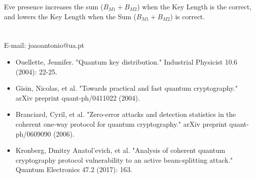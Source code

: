 \documentclass[1000pt]{article}
\newcommand{\mysection}[1]{\section*{\color{black}\sffamily #1}}%
\begin{document}
\begin{description}
\centering
\item Eve presence increases the sum ($B_{M1}+B_{M2}$) when the Key Length is the correct, and lowers the Key Length when the Sum ($B_{M1}+B_{M2}$) is correct.
\end{description}
\mysection{} \sffamily \Large
\vspace{-10mm}
\centerline{E-mail: joaoantonio@ua.pt}
\vspace*{7cm}
\begin{itemize}
	\item Ouellette, Jennifer. "Quantum key distribution." Industrial Physicist 10.6 (2004): 22-25.
	\item Gisin, Nicolas, et al. "Towards practical and fast quantum cryptography." arXiv preprint quant-ph/0411022 (2004).
	\item Branciard, Cyril, et al. "Zero-error attacks and detection statistics in the coherent one-way protocol for quantum cryptography." arXiv preprint quant-ph/0609090 (2006).
	\item Kronberg, Dmitry Anatol'evich, et al. "Analysis of coherent quantum cryptography protocol vulnerability to an active beam-splitting attack." Quantum Electronics 47.2 (2017): 163.
\end{itemize}
\end{document}
